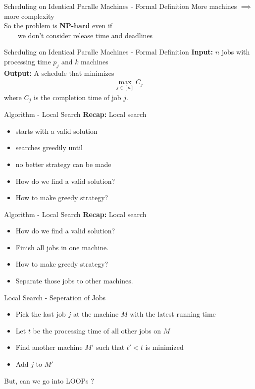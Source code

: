 \documentclass{beamer}
\newcommand*{\brk}{\\[10pt]}
\begin{document}
\begin{frame}{Scheduling on Identical Paralle Machines - Formal Definition}
    More machines $\implies$ more complexity \brk 
    So the problem is \textbf{NP-hard} even if \brk 
    \ \ \ \ we don't consider \color{red} release time \color{black} and \color{red} deadlines \color{black}
\end{frame}

\begin{frame}{Scheduling on Identical Paralle Machines - Formal Definition}
    \textbf{Input:} $n$ jobs with processing time $p_j$ and $k$ machines \brk 
    \textbf{Output:} A schedule that minimizes 
    \begin{align*}
        \max_{j \in [n]} C_j 
    \end{align*}
    where $C_j$ is the completion time of job $j$.
\end{frame}

\begin{frame}{Algorithm - Local Search}
    \textbf{Recap:} Local search 
    \begin{itemize}
        \item<1-3> starts with a valid solution 
        \item<2-3> searches greedily until 
        \item<3> no better strategy can be made 
        \item<4> How do we find a valid solution?
        \item<4> How to make greedy strategy?
    \end{itemize}
\end{frame}

\begin{frame}{Algorithm - Local Search}
    \textbf{Recap:} Local search 
    \begin{itemize}
        \item<1-> How do we find a valid solution?
        \item<2-> \color{red} Finish all jobs in one machine. \color{black}
        \item<1-> How to make greedy strategy?
        \item<3-> \color{red} Separate those jobs to other machines. \color{black}
    \end{itemize}
\end{frame}

\begin{frame}{Local Search - Seperation of Jobs}
    \begin{itemize}
        \item Pick the last job $j$ at the machine $M$ with the latest running time
        \item Let $t$ be the processing time of all other jobs on $M$
        \item Find another machine $M'$ such that $t' < t$ is minimized
        \item Add $j$ to $M'$
    \end{itemize}
    \pause 
    But, can we go into \color{red} LOOPs \color{black}?
\end{frame}
\end{document}

